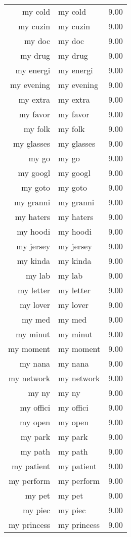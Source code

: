 \begin{table}[ht]
\begin{tabular}{rlr}
  my cold & my cold & 9.00 \\ 
  my cuzin & my cuzin & 9.00 \\ 
  my doc & my doc & 9.00 \\ 
  my drug & my drug & 9.00 \\ 
  my energi & my energi & 9.00 \\ 
  my evening & my evening & 9.00 \\ 
  my extra & my extra & 9.00 \\ 
  my favor & my favor & 9.00 \\ 
  my folk & my folk & 9.00 \\ 
  my glasses & my glasses & 9.00 \\ 
  my go & my go & 9.00 \\ 
  my googl & my googl & 9.00 \\ 
  my goto & my goto & 9.00 \\ 
  my granni & my granni & 9.00 \\ 
  my haters & my haters & 9.00 \\ 
  my hoodi & my hoodi & 9.00 \\ 
  my jersey & my jersey & 9.00 \\ 
  my kinda & my kinda & 9.00 \\ 
  my lab & my lab & 9.00 \\ 
  my letter & my letter & 9.00 \\ 
  my lover & my lover & 9.00 \\ 
  my med & my med & 9.00 \\ 
  my minut & my minut & 9.00 \\ 
  my moment & my moment & 9.00 \\ 
  my nana & my nana & 9.00 \\ 
  my network & my network & 9.00 \\ 
  my ny & my ny & 9.00 \\ 
  my offici & my offici & 9.00 \\ 
  my open & my open & 9.00 \\ 
  my park & my park & 9.00 \\ 
  my path & my path & 9.00 \\ 
  my patient & my patient & 9.00 \\ 
  my perform & my perform & 9.00 \\ 
  my pet & my pet & 9.00 \\ 
  my piec & my piec & 9.00 \\ 
  my princess & my princess & 9.00 \\ 

\end{tabular}
\end{table}
